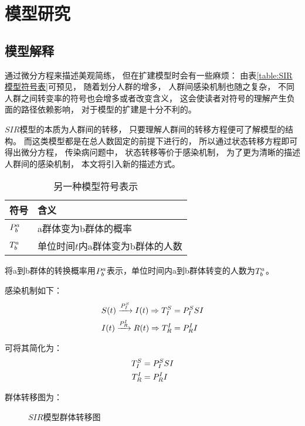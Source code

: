 \section{模型研究}
\subsection{模型解释}
\par 通过微分方程来描述美观简练，
但在扩建模型时会有一些麻烦：
由表\ref{table:SIR模型符号表}可预见，
随着划分人群的增多，
人群间感染机制也随之复杂，
不同人群之间转变率的符号也会增多或者改变含义，
这会使读者对符号的理解产生负面的路径依赖影响，
对于模型的扩建是十分不利的。
\par $SIR$模型的本质为人群间的转移，
只要理解人群间的转移方程便可了解模型的结构。
而这类模型都是在总人数固定的前提下进行的，
所以通过状态转移方程即可得出微分方程，
传染病问题中，
状态转移等价于感染机制，
为了更为清晰的描述人群间的感染机制，
本文将引入新的描述方式。
\begin{table}[H]
    \centering
    \caption{另一种模型符号表示}
    \begin{tabular}{ll}
        \hline
        符号       & 含义                              \\
        \hline
        $\P{a}{b}$ & a群体变为b群体的概率              \\
        $\T{a}{b}$ & 单位时间$t$内a群体变为b群体的人数 \\
        \hline
    \end{tabular}
\end{table}
\par 将a到b群体的转换概率用$\P{a}{b}$表示，单位时间内a到b群体转变的人数为$\T{a}{b}$。
\par 感染机制如下：
\begin{align}
    S(t)\xrightarrow{\P{S}{I}}I(t) \Rightarrow \TP{S}{I}{SI} \\
    I(t)\xrightarrow{\P{I}{R}}R(t) \Rightarrow \TP{I}{R}{I}
\end{align}
\par 可将其简化为：
\begin{align}
    \TP{S}{I}{SI} \label{math:TSI} \\
    \TP{I}{R}{I} \label{math:TIR}
\end{align}
\par 群体转移图为：
\begin{figure}[H]
    \centering
    \caption{$SIR$模型群体转移图}
\end{figure}
